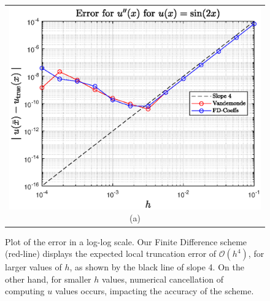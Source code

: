 \documentclass[aps,prl,preprint,groupedaddress]{revtex4-1}
\begin{document}
\begin{figure}[!htbp]
	\begin{tabular}{c}
		\includegraphics[width=.75\textwidth]{Figures/err_FD}
		(a)\\
	\end{tabular}
	\caption{Plot of the error in a log-log scale. Our Finite Difference scheme (red-line) displays the expected local truncation error of $\mathcal{O}(h^{4})$, for larger values of $h$, as shown by the black line of slope 4. On the other hand, for smaller $h$ values, numerical cancellation of computing $u$ values occurs, impacting the accuracy of the scheme.}
	\label{fig: err}
\end{figure}
\end{document}
